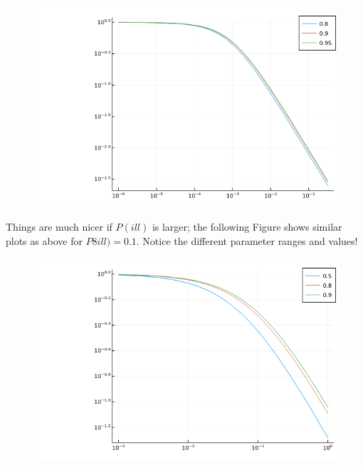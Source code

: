 \begin{figure}[H]
    \centering
    \includegraphics[scale=0.65]{images/bayes_illness_1.png}
\end{figure}

Things are much nicer if $P(ill)$ is larger; the following Figure shows similar plots as above for $P8ill)=0.1$. Notice the different parameter ranges and values!

\begin{figure}[H]
    \centering
    \includegraphics[scale=0.65]{images/bayes_illness_2.png}
\end{figure}



